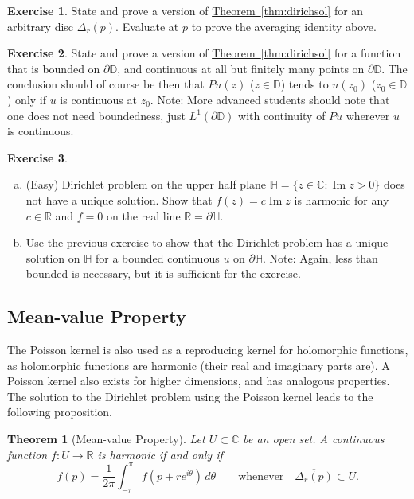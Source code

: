 \documentclass[12pt,openany]{book}
\renewcommand{\Im}{\operatorname{Im}}
\newcommand{\C}{{\mathbb{C}}}
\newcommand{\R}{{\mathbb{R}}}
\newcommand{\D}{{\mathbb{D}}}
\newcommand{\bH}{{\mathbb{H}}}
\theoremstyle{plain}
\newtheorem{thm}{Theorem}[section]
\theoremstyle{remark}
\theoremstyle{definition}
\newenvironment{exbox}{%
    \def\FrameCommand{\vrule width 1pt \relax\hspace {10pt}}%
    \MakeFramed {\advance \hsize -\width \FrameRestore }%
}{%
    \endMakeFramed
}
\newenvironment{exparts}{%
    \leavevmode\begin{enumerate}[a),noitemsep,topsep=0pt,parsep=0pt,partopsep=0pt]
}{%
    \end{enumerate}
}
\theoremstyle{exercise}
\newtheorem{exercise}{Exercise}[section]
\theoremstyle{example}
\newcommand{\thmref}[1]{\hyperref[#1]{Theorem~\ref*{#1}}}
\begin{document}
\begin{exbox}
\begin{exercise}
State and prove a version of \thmref{thm:dirichsol} for an arbitrary disc
$\Delta_r(p)$.  Evaluate at $p$ to prove the averaging identity above.
\end{exercise}

\begin{exercise}
State and prove a version of \thmref{thm:dirichsol} for a function that is
bounded on $\partial \D$, and continuous at all but finitely many points on
$\partial \D$.  The conclusion should of course be then that $Pu(z)$ ($z \in
\D$) tends
to $u(z_0)$ ($z_0 \in \D$) only if $u$ is continuous at $z_0$.
Note: More advanced students should note that one does not need boundedness,
just $L^1(\partial \D)$ with continuity of $Pu$ wherever $u$ is continuous.
\end{exercise}

\begin{exercise}
\begin{exparts}
\item (Easy)
Dirichlet problem on the upper half plane $\bH = \{ z \in \C : \Im z > 0 \}$
does not have a unique solution.  Show that $f(z) = c \Im z$ is harmonic for
any $c \in \R$ and $f = 0$ on the real line $\R = \partial \bH$.
\item 
Use the previous exercise to show that the Dirichlet problem has a unique
solution on $\bH$ for a bounded continuous $u$ on $\partial \bH$.
Note: Again, less than bounded is
necessary, but it is sufficient for the exercise.
\end{exparts}
\end{exercise}
\end{exbox}

\subsection{Mean-value Property}

The Poisson kernel is also used as a reproducing kernel for
holomorphic functions, as holomorphic functions are harmonic (their real and
imaginary parts are).
A Poisson kernel also exists for higher dimensions, and has
analogous properties.
The solution to the Dirichlet problem using the Poisson kernel leads to
the following proposition.

\begin{thm}[Mean-value Property]
\label{prop:meanprop}
Let $U \subset \C$ be an open set.
A continuous function
$f \colon U \to \R$
is harmonic if and only if 
\begin{equation*}
f(p) = \frac{1}{2\pi} \int_{-\pi}^{\pi} f(p+re^{i\theta})\, d\theta
\qquad \text{whenever} \quad
\overline{\Delta_r(p)} \subset U .
\end{equation*}
\end{thm}
\end{document}
